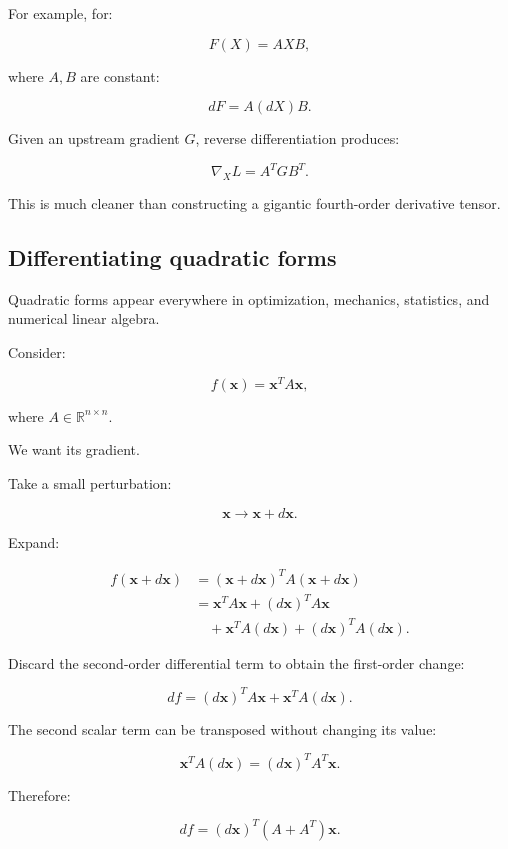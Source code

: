 For example, for:

\[
F(X)=AXB,
\]

where \(A,B\) are constant:

\[
\boxed{ dF=A(dX)B }.
\]

Given an upstream gradient \(G\), reverse differentiation produces:

\[
\boxed{ \nabla_XL=A^TGB^T }.
\]

This is much cleaner than constructing a gigantic fourth-order derivative tensor.

\subsection{Differentiating quadratic forms}\label{02-foundations-ii-ch027-differentiating-quadratic-forms}

\hypertarget{02-foundations-ii-ch027-differentiating-quadratic-forms}{}

Quadratic forms appear everywhere in optimization, mechanics, statistics, and numerical linear algebra.

Consider:

\[
f(\mathbf x)=\mathbf x^TA\mathbf x,
\]

where \(A\in\mathbb R^{n\times n}\).

We want its gradient.

Take a small perturbation:

\[
\mathbf x\longrightarrow\mathbf x+d\mathbf x.
\]

Expand:

\[
\begin{aligned} f(\mathbf x+d\mathbf x) &=(\mathbf x+d\mathbf x)^TA(\mathbf x+d\mathbf x)\\ &=\mathbf x^TA\mathbf x +(d\mathbf x)^TA\mathbf x\\ &\quad+\mathbf x^TA(d\mathbf x) +(d\mathbf x)^TA(d\mathbf x). \end{aligned}
\]

Discard the second-order differential term to obtain the first-order change:

\[
df= (d\mathbf x)^TA\mathbf x+ \mathbf x^TA(d\mathbf x).
\]

The second scalar term can be transposed without changing its value:

\[
\mathbf x^TA(d\mathbf x) = (d\mathbf x)^TA^T\mathbf x.
\]

Therefore:

\[
df= (d\mathbf x)^T(A+A^T)\mathbf x.
\]

